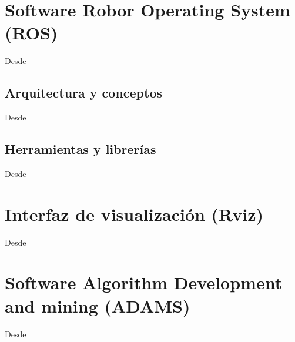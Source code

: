     
\section{Software Robor Operating System (ROS)}
    Desde
    \subsection{Arquitectura y conceptos}
        Desde
    \subsection{Herramientas y librerías}
        Desde

\section{Interfaz de visualización (Rviz)}
    Desde
    
\section{Software Algorithm Development and mining (ADAMS)}
Desde

    
      
        
            
            
            

        
    
    